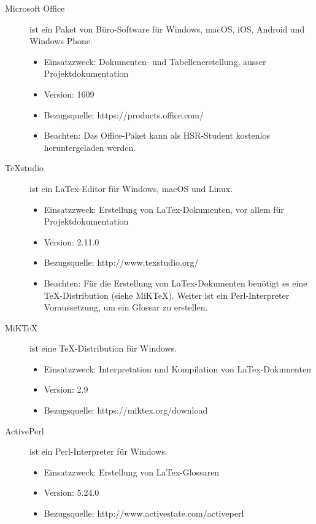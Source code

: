 \begin{description}
	\item [Microsoft Office] ist ein Paket von Büro-Software für Windows, macOS, iOS, Android und Windows Phone. \cite{wikipedia_microsoft-office}
	\begin{itemize}
		\item Einsatzzweck: Dokumenten- und Tabellenerstellung, ausser Projektdokumentation
		\item Version: 1609
		\item Bezugsquelle: https://products.office.com/
		\item Beachten: Das Office-Paket kann als HSR-Student kostenlos heruntergeladen werden.
	\end{itemize}
	
	
	\item [TeXstudio] ist ein LaTex-Editor für Windows, macOS und Linux.
	\begin{itemize}
		\item Einsatzzweck: Erstellung von LaTex-Dokumenten, vor allem für Projektdokumentation
		\item Version: 2.11.0
		\item Bezugsquelle: http://www.texstudio.org/
		\item Beachten: Für die Erstellung von LaTex-Dokumenten benötigt es eine TeX-Distribution (siehe MiKTeX). Weiter ist ein Perl-Interpreter Voraussetzung, um ein Glossar zu erstellen.
	\end{itemize}
	
	
	\item [MiKTeX] ist eine TeX-Distribution für Windows. \cite{wikipedia_miktex}
	\begin{itemize}
		\item Einsatzzweck: Interpretation und Kompilation von LaTex-Dokumenten
		\item Version: 2.9
		\item Bezugsquelle: https://miktex.org/download
	\end{itemize}
	
	
	\item [ActivePerl] ist ein Perl-Interpreter für Windows.
	\begin{itemize}
		\item Einsatzzweck: Erstellung von LaTex-Glossaren
		\item Version: 5.24.0
		\item Bezugsquelle: http://www.activestate.com/activeperl
	\end{itemize}
	

\end{description}
